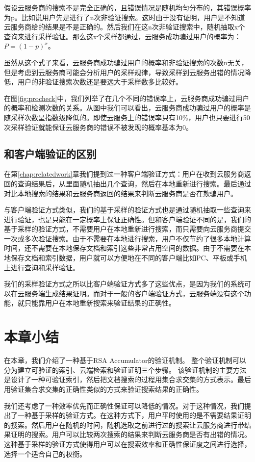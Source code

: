 假设云服务商的搜索不是完全正确的，且错误情况是随机均匀分布的，其错误概率为p。比如说用户先是进行了n次非验证搜索。这时由于没有证明，用户是不知道云服务商给的结果是不是正确的。然后我们在这n次非验证搜索中，随机抽取x个查询来进行采样验证。那么这x个采样都通过，云服务成功骗过用户的概率为：$P = (1-p)^x$。

虽然从这个式子来看，云服务商成功骗过用户的概率和非验证搜索的次数n无关，但是考虑到云服务商可能会分析用户的采样规律，导致采样到云服务出错的情况降低，用户的非验证搜索次数还是要远大于采样数多比较好。

在图\ref{fig:procheck}中，我们列举了在几个不同的错误率上，云服务商成功骗过用户的概率和检测次数的关系。从图中我们可以看出，云服务商成功骗过用户的概率是随采样次数呈指数级降低的。即使云服务上的错误率只有10\%，用户也只要进行50次采样验证就能保证云服务商的错误不被发现的概率基本为0。

\subsection{和客户端验证的区别}
在第\ref{chap:relatedwork}章我们提到过一种客户端验证方式：用户在收到云服务商返回的查询结果后，从里面随机抽出几个查询，然后在本地重新进行搜索。最后通过对比本地搜索的结果和云服务商返回的结果来判断云服务商是否在欺骗用户。

与客户端验证方式类似，我们的基于采样的验证方式也是通过随机抽取一些查询来进行验证，也是只能在一定概率上保证正确性。但和客户端验证不同的是，我们的基于采样的验证方式，不需要用户在本地重新进行搜索，而只需要向云服务商提交一次或多次验证搜索。由于不需要在本地进行搜索，用户不仅节约了很多本地计算时间，还不需要在本地保存文档和索引这些非常占用空间的数据。由于不需要在本地保存文档和索引数据，用户就可以方便地在不同的客户端比如PC、平板或手机上进行查询和采样验证。

我们的采样验证方式之所以比客户端验证方式多了这些优点，是因为我们的系统可以在云服务端生成结果证明。而对于一般的客户端验证方式，云服务端没有这个功能，就只能靠用户在本地重新搜索来验证结果的正确性。

\section{本章小结}
在本章，我们介绍了一种基于RSA Accumulator的验证机制。
整个验证机制可以分为建立可验证的索引、云端检索和验证证明三个步骤。
该验证机制的主要方法是设计了一种可验证索引，然后把文档搜索的过程用集合求交集的方式表示。最后用验证集合求交集的正确性类似的方式来验证搜索结果的正确性。

我们还考虑了一种效率优先而正确性保证可以降低的情况。对于这种情况，我们提出了一种基于采样的验证方式。在这种方式下，用户平时使用的是不需要结果证明的搜索。然后用户在随机的时间，随机选取之前进行过的搜索让云服务商进行带结果证明的搜索。用户可以比较两次搜索的结果来判断云服务商是否有出错的情况。这种基于采样的验证方式使得用户可以在搜索效率和正确性保证度之间进行选择，选择一个适合自己的权衡。
